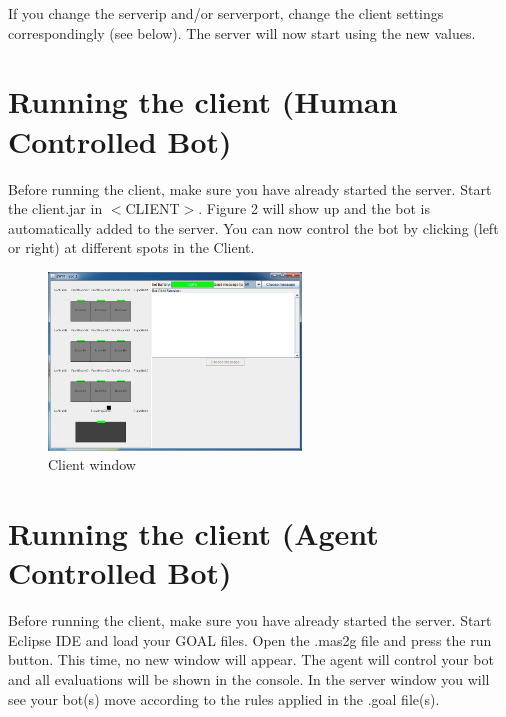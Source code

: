 \documentclass[11pt,a4paper]{article}
\begin{document}
If you change the serverip and/or serverport, change the client settings correspondingly (see below).
The server will now start using the new values.

\section{Running the client (Human Controlled Bot)}
Before running the client, make sure you have already started the server. Start the client.jar in $<$CLIENT$>$. Figure 2 will show up and the bot is automatically added to the server. You can now control the bot by clicking (left or right) at different spots in the Client.
\begin{figure}
  \begin{center}
    \includegraphics[width=0.6\textwidth]{client.png}
  \end{center}
  \caption{Client window}
\end{figure}

\section{Running the client (Agent Controlled Bot)}
Before running the client, make sure you have already started the server. Start Eclipse IDE and load your GOAL files. Open the .mas2g file and press the run button. This time, no new window will appear. The agent will control your bot and all evaluations will be shown in the console. In the server window you will see your bot(s) move according to the rules applied in the .goal file(s).
\end{document}
